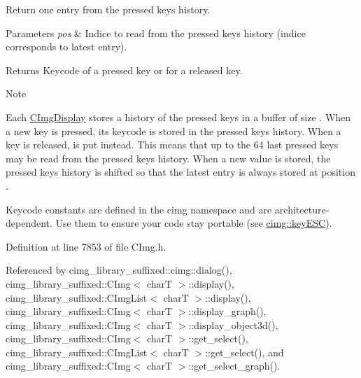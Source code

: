 Return one entry from the pressed keys history. 


\begin{DoxyParams}{Parameters}
{\em pos} & Indice to read from the pressed keys history (indice {} corresponds to latest entry). \\
\hline
\end{DoxyParams}
\begin{DoxyReturn}{Returns}
Keycode of a pressed key or {} for a released key. 
\end{DoxyReturn}
\begin{DoxyNote}{Note}

\begin{DoxyItemize}
\item Each \hyperlink{structcimg__library__suffixed_1_1CImgDisplay}{C\+Img\+Display} stores a history of the pressed keys in a buffer of size {}. When a new key is pressed, its keycode is stored in the pressed keys history. When a key is released, {} is put instead. This means that up to the 64 last pressed keys may be read from the pressed keys history. When a new value is stored, the pressed keys history is shifted so that the latest entry is always stored at position {}.
\item Keycode constants are defined in the cimg namespace and are architecture-\/dependent. Use them to ensure your code stay portable (see \hyperlink{namespacecimg__library__suffixed_1_1cimg_abaabb7beac6bae90502bd8378f7037f9}{cimg\+::key\+E\+SC}). 
\end{DoxyItemize}
\end{DoxyNote}


Definition at line 7853 of file C\+Img.\+h.



Referenced by cimg\+\_\+library\+\_\+suffixed\+::cimg\+::dialog(), cimg\+\_\+library\+\_\+suffixed\+::\+C\+Img$<$ char\+T $>$\+::display(), cimg\+\_\+library\+\_\+suffixed\+::\+C\+Img\+List$<$ char\+T $>$\+::display(), cimg\+\_\+library\+\_\+suffixed\+::\+C\+Img$<$ char\+T $>$\+::display\+\_\+graph(), cimg\+\_\+library\+\_\+suffixed\+::\+C\+Img$<$ char\+T $>$\+::display\+\_\+object3d(), cimg\+\_\+library\+\_\+suffixed\+::\+C\+Img$<$ char\+T $>$\+::get\+\_\+select(), cimg\+\_\+library\+\_\+suffixed\+::\+C\+Img\+List$<$ char\+T $>$\+::get\+\_\+select(), and cimg\+\_\+library\+\_\+suffixed\+::\+C\+Img$<$ char\+T $>$\+::get\+\_\+select\+\_\+graph().

